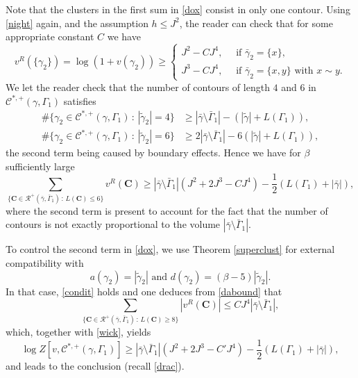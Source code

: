 \documentclass[10pt]{amsart}
\let\mathcal\mathscr
\newcommand{\sep}{\,:\,}
\numberwithin{equation}{section}
\theoremstyle{plain}
\theoremstyle{definition}
\newcommand{\cC}{{\ensuremath{\mathcal C}} }
\newcommand{\cR}{{\ensuremath{\mathcal R}} }
\newcommand{\bC}{{\ensuremath{\mathbf C}} }
\newcommand{\gb}{\beta}
\newcommand{\gG}{\Gamma}
\begin{document}
Note that the clusters in the first sum in \eqref{dox} consist in only one contour. Using \eqref{night} again, and the assumption $h\le J^2$, the reader can check that for some appropriate constant $C$ we have
\begin{equation}\label{speel}
v^R(\{\gamma_2\})=\log\left(1+ v(\gamma_2)\right)\ge \begin{cases} J^2-C J^4, \quad \text{ if } \bar \gamma_2=\{x\},\\
J^3-C J^4, \quad \text{ if } \bar \gamma_2=\{x,y\} \text{ with } x\sim y.
\end{cases}
\end{equation}
We let the reader check that the number of contours of length $4$ and $6$ in $\cC^{*,+}(\gamma,\gG_1)$ satisfies
\begin{equation*}
\begin{split}
\#\{ \gamma_2\in \cC^{*,+}(\gamma,\gG_1) \sep |\tilde \gamma_2|=4\}&\ge |\bar \gamma\setminus\bar \gG_1|-(|\tilde \gamma|+L(\gG_1)),\\
\#\{ \gamma_2\in \cC^{*,+}(\gamma,\gG_1) \sep |\tilde \gamma_2|=6\}&\ge 2|\bar \gamma\setminus\bar \gG_1|-6(|\tilde \gamma|+L(\gG_1)),
\end{split}
\end{equation*}
the second term being caused by boundary effects.
Hence we have for $\gb$ sufficiently large
\begin{equation}\label{wick}
\sum_{\{ \bC\in \cR^+(\bar \gamma,\bar \gG_1) \sep L(\bC)\le 6\}} v^R(\bC)
\ge |\bar \gamma\setminus\bar \gG_1|(J^2+2J^3-CJ^4)- \frac{1}{2}(L(\gG_1)+|\bar \gamma|),
\end{equation}
where the second term is present to account for the fact that the number of contours is not exactly proportional to the volume $|\bar \gamma\setminus\bar \gG_1|$.

To control the second term in \eqref{dox}, we use Theorem \ref{superclust} for external compatibility with
\[
a(\gamma_2)=|\tilde \gamma_2| \text{ and } d(\gamma_2)=(\gb-5)|\tilde \gamma_2|.
\]
In that case, \eqref{condit} holds and one deduces from \eqref{dabound} that
\begin{equation*}
\sum_{\{ \bC\in \cR^+(\bar \gamma,\bar \gG_1) \sep L(\bC)\ge 8\}} \left|v^R(\bC)\right|\le CJ^4|\bar \gamma\setminus\bar \gG_1|,
\end{equation*}
which, together with \eqref{wick}, yields
\begin{equation*}
\log Z[v,\cC^{*,+}(\gamma,\gG_1)]\ge |\bar \gamma\setminus\bar \gG_1|(J^2+2J^3-C'J^4)- \frac{1}{2}(L(\gG_1)+|\bar \gamma|),
\end{equation*}
and leads to the conclusion (recall \eqref{drac}).
\end{document}

